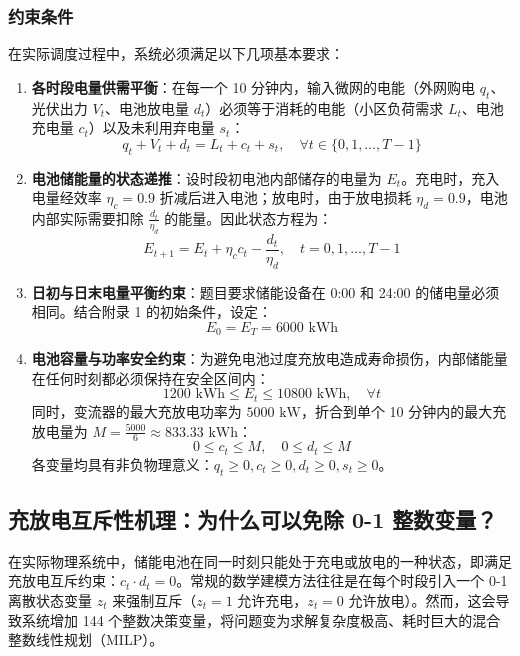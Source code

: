 \documentclass[withoutpreface]{cumcmthesis}
\begin{document}
\subsubsection{约束条件}
在实际调度过程中，系统必须满足以下几项基本要求：
\begin{enumerate}
    \item \textbf{各时段电量供需平衡}：在每一个 10 分钟内，输入微网的电能（外网购电 $q_t$、光伏出力 $V_t$、电池放电量 $d_t$）必须等于消耗的电能（小区负荷需求 $L_t$、电池充电量 $c_t$）以及未利用弃电量 $s_t$：
    \begin{equation}
        q_t + V_t + d_t = L_t + c_t + s_t, \quad \forall t \in \{0, 1, \dots, T-1\} \label{eq:q1_balance}
    \end{equation}
    
    \item \textbf{电池储能量的状态递推}：设时段初电池内部储存的电量为 $E_t$。充电时，充入电量经效率 $\eta_c = 0.9$ 折减后进入电池；放电时，由于放电损耗 $\eta_d = 0.9$，电池内部实际需要扣除 $\frac{d_t}{\eta_d}$ 的能量。因此状态方程为：
    \begin{equation}
        E_{t+1} = E_t + \eta_c c_t - \frac{d_t}{\eta_d}, \quad t = 0, 1, \dots, T-1 \label{eq:q1_soc}
    \end{equation}
    
    \item \textbf{日初与日末电量平衡约束}：题目要求储能设备在 0:00 和 24:00 的储电量必须相同。结合附录 1 的初始条件，设定：
    \begin{equation}
        E_0 = E_T = 6000\text{ kWh}
    \end{equation}
    
    \item \textbf{电池容量与功率安全约束}：为避免电池过度充放电造成寿命损伤，内部储能量在任何时刻都必须保持在安全区间内：
    \begin{equation}
        1200\text{ kWh} \le E_t \le 10800\text{ kWh}, \quad \forall t
    \end{equation}
    同时，变流器的最大充放电功率为 $5000\text{ kW}$，折合到单个 10 分钟内的最大充放电量为 $M = \frac{5000}{6} \approx 833.33\text{ kWh}$：
    \begin{equation}
        0 \le c_t \le M, \quad 0 \le d_t \le M
    \end{equation}
    各变量均具有非负物理意义：$q_t \ge 0, c_t \ge 0, d_t \ge 0, s_t \ge 0$。
\end{enumerate}

\subsection{充放电互斥性机理：为什么可以免除 0-1 整数变量？}
在实际物理系统中，储能电池在同一时刻只能处于充电或放电的一种状态，即满足充放电互斥约束：$c_t \cdot d_t = 0$。常规的数学建模方法往往是在每个时段引入一个 0-1 离散状态变量 $z_t$ 来强制互斥（$z_t=1$ 允许充电，$z_t=0$ 允许放电）。然而，这会导致系统增加 144 个整数决策变量，将问题变为求解复杂度极高、耗时巨大的混合整数线性规划（MILP）。
\end{document}
